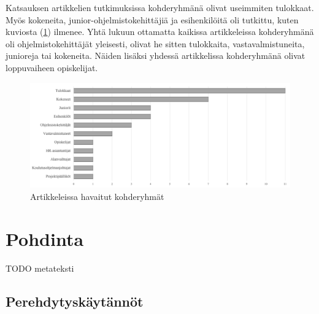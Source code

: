 \documentclass[utf8]{gradu3}
\begin{document}
Katsauksen artikkelien tutkimuksissa kohderyhmänä olivat useimmiten tulokkaat. Myös kokeneita, junior-ohjelmistokehittäjiä ja esihenkilöitä oli tutkittu, kuten kuviosta (\ref{kuvio:kohderyhmat}) ilmenee. Yhtä lukuun ottamatta kaikissa artikkeleissa kohderyhmänä oli ohjelmistokehittäjät yleisesti, olivat he sitten tulokkaita, vastavalmistuneita, junioreja tai kokeneita. Näiden lisäksi yhdessä artikkelissa kohderyhmänä olivat loppuvaiheen opiskelijat.

\begin{figure}[h]
    \centering
    \includegraphics[width=\textwidth]{media/kohderyhmat.png}
    \caption{Artikkeleissa havaitut kohderyhmät}
    \label{kuvio:kohderyhmat}
\end{figure}

\chapter{Pohdinta}
\label{paaluku-pohdinta}

TODO metateksti

\section{Perehdytyskäytännöt}
\end{document}
